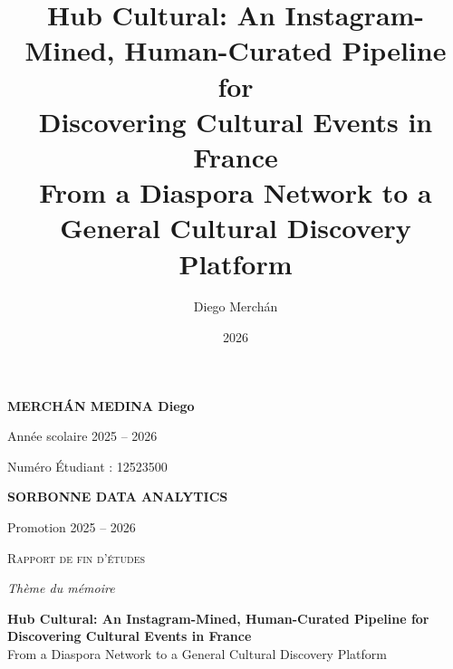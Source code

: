 \documentclass[12pt, a4paper]{report}
\title{
    \textbf{Hub Cultural: An Instagram-Mined, Human-Curated Pipeline for\\
    Discovering Cultural Events in France} \\
    \vspace{0.5cm}
    \large From a Diaspora Network to a General Cultural Discovery Platform
}
\author{Diego Merchán}
\date{2026}
\begin{document}
\begin{titlepage}
\centering
\vspace*{1cm}

{\Large\bfseries MERCHÁN MEDINA Diego \par}
{\large Année scolaire 2025 -- 2026 \par}
\vspace{0.3cm}
{\large Numéro Étudiant : 12523500 \par}

\vspace{1.5cm}
{\Large\bfseries SORBONNE DATA ANALYTICS \par}
{\large Promotion 2025 -- 2026 \par}

\vspace{1.5cm}
{\Large\scshape Rapport de fin d'\'{e}tudes \par}

\vspace{2cm}
{\large\itshape Th\`{e}me du m\'{e}moire \par}
\vspace{0.3cm}
\textbf{Hub Cultural: An Instagram-Mined, Human-Curated Pipeline for
Discovering Cultural Events in France} \\[0.2cm]
\large From a Diaspora Network to a General Cultural Discovery Platform

\vfill
\end{titlepage}
\end{document}
